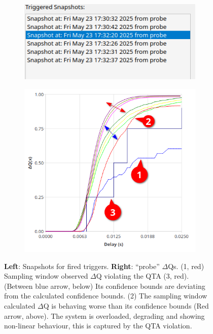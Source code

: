         \begin{figure}[H]
            \centering
            \begin{subfigure}{.5\textwidth}
                \centering
                \includegraphics[width=0.98\textwidth]{img/violated.png}
                \label{fig:high_load_1}
            \end{subfigure}%
            \begin{subfigure}{.5\textwidth}
                \centering
                \includegraphics[width =0.98\textwidth]{img/overload_2/qta_triggerd2.png}
                \label{fig:high_load_2}
            \end{subfigure}
            \caption{\textbf{Left}: Snapshots for fired triggers.
            \textbf{Right}: ``probe'' $\Delta$Qs. (1, red) Sampling window observed $\Delta$Q violating the QTA (3, red). (Between blue arrow, below) Its confidence bounds are deviating from the calculated confidence bounds. (2) The sampling window calculated $\Delta$Q is behaving worse than its confidence bounds (Red arrow, above). The system is overloaded, degrading and showing non-linear behaviour, this is captured by the QTA violation.} %
            \label{fig:qta_viol_1}
        \end{figure}
        

